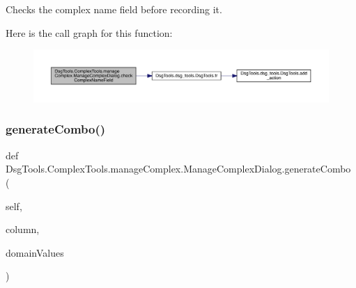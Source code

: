 \begin{DoxyVerb}Checks the complex name field before recording it.
\end{DoxyVerb}
 Here is the call graph for this function\+:
\nopagebreak
\begin{figure}[H]
\begin{center}
\leavevmode
\includegraphics[width=350pt]{class_dsg_tools_1_1_complex_tools_1_1manage_complex_1_1_manage_complex_dialog_a328662e0ada620af3647acdc87a7b111_cgraph}
\end{center}
\end{figure}
\mbox{\label{class_dsg_tools_1_1_complex_tools_1_1manage_complex_1_1_manage_complex_dialog_aac3390863edf9ad88887aa65e640c445}} 
\subsubsection{\texorpdfstring{generate\+Combo()}{generateCombo()}}
{\footnotesize\ttfamily def Dsg\+Tools.\+Complex\+Tools.\+manage\+Complex.\+Manage\+Complex\+Dialog.\+generate\+Combo (\begin{DoxyParamCaption}\item[{}]{self,  }\item[{}]{column,  }\item[{}]{domain\+Values }\end{DoxyParamCaption})}

